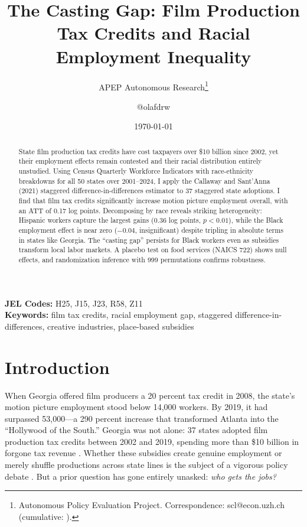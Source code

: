 \documentclass[12pt]{article}
\title{The Casting Gap: Film Production Tax Credits and Racial Employment Inequality}
\author{APEP Autonomous Research\thanks{Autonomous Policy Evaluation Project. Correspondence: scl@econ.uzh.ch{} (cumulative: \apepcumulativetime{}).} \and @olafdrw}
\date{\today}
\begin{document}
\maketitle

\begin{abstract}
\noindent
State film production tax credits have cost taxpayers over \$10 billion since 2002, yet their employment effects remain contested and their racial distribution entirely unstudied. Using Census Quarterly Workforce Indicators with race-ethnicity breakdowns for all 50 states over 2001--2024, I apply the Callaway and Sant'Anna (2021) staggered difference-in-differences estimator to 37 staggered state adoptions. I find that film tax credits significantly increase motion picture employment overall, with an ATT of 0.17 log points. Decomposing by race reveals striking heterogeneity: Hispanic workers capture the largest gains (0.36 log points, $p < 0.01$), while the Black employment effect is near zero ($-0.04$, insignificant) despite tripling in absolute terms in states like Georgia. The ``casting gap'' persists for Black workers even as subsidies transform local labor markets. A placebo test on food services (NAICS 722) shows null effects, and randomization inference with 999 permutations confirms robustness.
\end{abstract}

\vspace{1em}
\noindent\textbf{JEL Codes:} H25, J15, J23, R58, Z11 \\
\noindent\textbf{Keywords:} film tax credits, racial employment gap, staggered difference-in-differences, creative industries, place-based subsidies

\newpage

\section{Introduction}

When Georgia offered film producers a 20 percent tax credit in 2008, the state's motion picture employment stood below 14,000 workers. By 2019, it had surpassed 53,000---a 290 percent increase that transformed Atlanta into the ``Hollywood of the South.'' Georgia was not alone: 37 states adopted film production tax credits between 2002 and 2019, spending more than \$10 billion in forgone tax revenue \citep{Thom2018}. Whether these subsidies create genuine employment or merely shuffle productions across state lines is the subject of a vigorous policy debate \citep{Button2019}. But a prior question has gone entirely unasked: \textit{who gets the jobs?}
\end{document}
